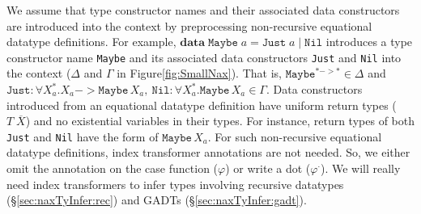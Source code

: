 We assume that type constructor names and their associated data constructors
are introduced into the context by preprocessing non-recursive equational
datatype definitions. For example,
$\textbf{data}\;\texttt{Maybe}\;a = \texttt{Just}\;a \mid \texttt{Nil}$
introduces a type constructor name \texttt{Maybe} and its associated
data constructors \texttt{Just} and \texttt{Nil} into the context
($\Delta$ and $\Gamma$ in Figure\;\ref{fig:SmallNax}). That is,
$\texttt{Maybe}^{* -> *} \in \Delta$ and
$\texttt{Just}: \forall X_a^{*}.X_a -> \texttt{Maybe}\,X_a,~
 \texttt{Nil} : \forall X_a^{*}.\texttt{Maybe}\,X_a \in \Gamma$.
Data constructors introduced from an equational datatype definition have
uniform return types ($T\;\overline{X}$) and no existential variables
in their types. For instance, return types of both \texttt{Just} and
\texttt{Nil} have the form of $\texttt{Maybe}\,X_a$. For such non-recursive
equational datatype definitions, index transformer annotations are not needed.
So, we either omit the annotation on the case function ($\varphi$) or
write a dot ($\varphi^\cdot$). We will really need index transformers
to infer types involving recursive datatypes (\S\ref{sec:naxTyInfer:rec})
and GADTs (\S\ref{sec:naxTyInfer:gadt}).

